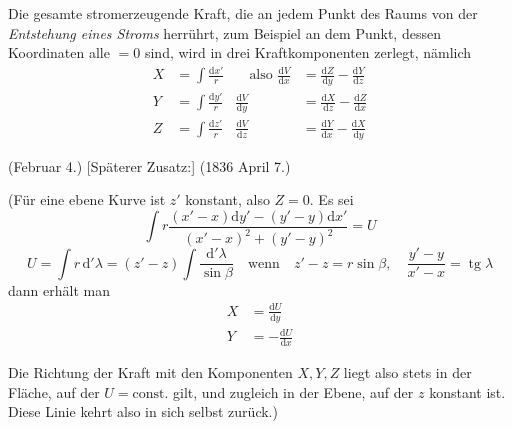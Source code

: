 \vspace{4mm}
Die gesamte stromerzeugende Kraft, die an jedem Punkt des Raums von der \textit{Entstehung eines Stroms} herrührt, zum Beispiel an dem Punkt, dessen Koordinaten alle $=0$ sind, wird in drei Kraftkomponenten zerlegt, nämlich
\[
\begin{aligned}
X&=\int\frac{\mathrm dx'}{r}&\quad\text{also }\frac{\mathrm dV}{\mathrm dx}&=\frac{\mathrm dZ}{\mathrm dy}-\frac{\mathrm dY}{\mathrm dz}\\[4pt]
Y&=\int\frac{\mathrm dy'}{r}&\frac{\mathrm dV}{\mathrm dy}&=\frac{\mathrm dX}{\mathrm dz}-\frac{\mathrm dZ}{\mathrm dx}\\[4pt]
Z&=\int\frac{\mathrm dz'}{r}&\frac{\mathrm dV}{\mathrm dz}&=\frac{\mathrm dY}{\mathrm dx}-\frac{\mathrm dX}{\mathrm dy}
\end{aligned}
\]

(Februar 4.) [Späterer Zusatz:] (1836 April 7.)

(Für eine ebene Kurve ist $z'$ konstant, also $Z=0$. Es sei
\[
\int r\frac{(x'-x)\mathrm dy'-(y'-y)\mathrm dx'}{(x'-x)^2+(y'-y)^2}=U
\]
\[
U=\int r\,\mathrm d'\lambda=(z'-z)\int\frac{\mathrm d'\lambda}{\sin\beta}\quad\text{wenn}\quad z'-z=r\sin\beta,\quad\frac{y'-y}{x'-x}=\operatorname{tg}\lambda
\]
dann erhält man
\[
\begin{aligned}
X&=\frac{\mathrm dU}{\mathrm dy}\\[4pt]
Y&=-\frac{\mathrm dU}{\mathrm dx}
\end{aligned}
\]

Die Richtung der Kraft mit den Komponenten $X,Y,Z$ liegt also stets in der Fläche, auf der $U=\text{const.}$ gilt, und zugleich in der Ebene, auf der $z$ konstant ist. Diese Linie kehrt also in sich selbst zurück.)

